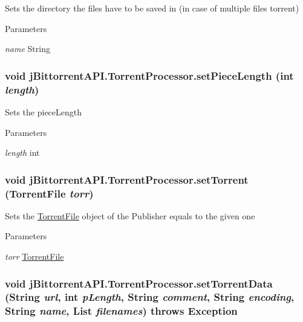 \label{classj_bittorrent_a_p_i_1_1_torrent_processor_a4ab8920ed8edfa98737326904433ecc6}
Sets the directory the files have to be saved in (in case of multiple files torrent) 
\begin{DoxyParams}{Parameters}
\item[{\em name}]String \end{DoxyParams}
\hypertarget{classj_bittorrent_a_p_i_1_1_torrent_processor_a93c918d9dae163839b5a5c55af3db345}{
\subsubsection[{setPieceLength}]{\setlength{\rightskip}{0pt plus 5cm}void jBittorrentAPI.TorrentProcessor.setPieceLength (int {\em length})}}
\label{classj_bittorrent_a_p_i_1_1_torrent_processor_a93c918d9dae163839b5a5c55af3db345}
Sets the pieceLength 
\begin{DoxyParams}{Parameters}
\item[{\em length}]int \end{DoxyParams}
\hypertarget{classj_bittorrent_a_p_i_1_1_torrent_processor_ab593b497792415fd4b8d9221c6d7f391}{
\subsubsection[{setTorrent}]{\setlength{\rightskip}{0pt plus 5cm}void jBittorrentAPI.TorrentProcessor.setTorrent ({\bf TorrentFile} {\em torr})}}
\label{classj_bittorrent_a_p_i_1_1_torrent_processor_ab593b497792415fd4b8d9221c6d7f391}
Sets the \hyperlink{classj_bittorrent_a_p_i_1_1_torrent_file}{TorrentFile} object of the Publisher equals to the given one 
\begin{DoxyParams}{Parameters}
\item[{\em torr}]\hyperlink{classj_bittorrent_a_p_i_1_1_torrent_file}{TorrentFile} \end{DoxyParams}
\hypertarget{classj_bittorrent_a_p_i_1_1_torrent_processor_ae7e8114cb0d891424812ceac8fe62aad}{
\subsubsection[{setTorrentData}]{\setlength{\rightskip}{0pt plus 5cm}void jBittorrentAPI.TorrentProcessor.setTorrentData (String {\em url}, \/  int {\em pLength}, \/  String {\em comment}, \/  String {\em encoding}, \/  String {\em name}, \/  List {\em filenames})  throws Exception }}
